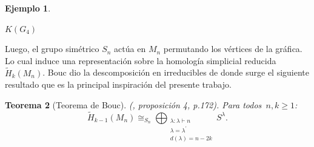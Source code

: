 \documentclass[12pt]{book}
\newtheorem{theorem}{Teorema}[section]
\theoremstyle{definition}
\newtheorem{example}[theorem]{Ejemplo}
\newcounter{in}
\newcounter{ini}
\begin{document}
\begin{example}
\begin{center}
\begin{minipage}{0.38\linewidth}

$K(G_{4})$
  \end{minipage}
\end{center}
\end{example}

Luego, el grupo simétrico $S_n$ actúa en $M_n$ permutando los vértices
de la gráfica. Lo cual induce una representación sobre la homología
simplicial reducida $\widetilde H_{k}(M_{n})$. Bouc \cite{MR756517}
dio la descomposición en irreducibles de donde surge el siguiente
resultado que es la principal inspiración del presente trabajo.

\begin{theorem}[Teorema de Bouc]{\normalfont(\cite{MR756517}, proposición 4, p.172)}.
  Para todos~$n,k\geq1$:
  \begin{equation}
    \label{bouc}
    \widetilde H_{k-1}(M_{n})\cong_{S_{n}}\bigoplus_{\substack{\lambda:\lambda\vdash n\\
      \lambda=\lambda^{'}\\d(\lambda)=n-2k}} S^{\lambda}.
  \end{equation}
\end{theorem}
\end{document}
